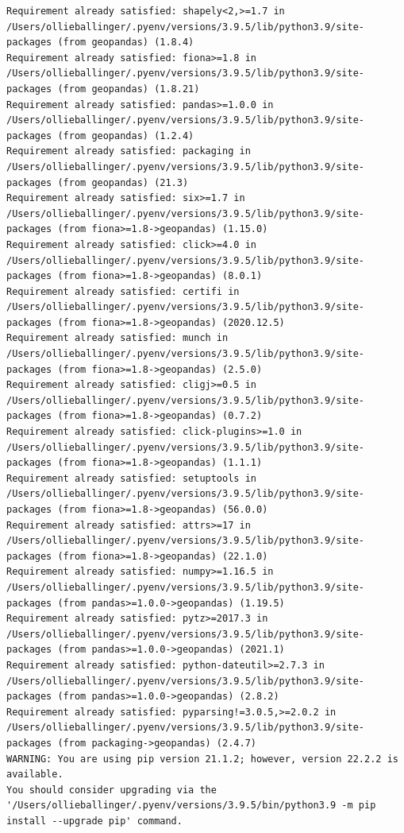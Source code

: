 \documentclass[
  letterpaper,
  DIV=11,
  numbers=noendperiod]{scrreprt}
\begin{document}
\begin{verbatim}
Requirement already satisfied: shapely<2,>=1.7 in /Users/ollieballinger/.pyenv/versions/3.9.5/lib/python3.9/site-packages (from geopandas) (1.8.4)
Requirement already satisfied: fiona>=1.8 in /Users/ollieballinger/.pyenv/versions/3.9.5/lib/python3.9/site-packages (from geopandas) (1.8.21)
Requirement already satisfied: pandas>=1.0.0 in /Users/ollieballinger/.pyenv/versions/3.9.5/lib/python3.9/site-packages (from geopandas) (1.2.4)
Requirement already satisfied: packaging in /Users/ollieballinger/.pyenv/versions/3.9.5/lib/python3.9/site-packages (from geopandas) (21.3)
Requirement already satisfied: six>=1.7 in /Users/ollieballinger/.pyenv/versions/3.9.5/lib/python3.9/site-packages (from fiona>=1.8->geopandas) (1.15.0)
Requirement already satisfied: click>=4.0 in /Users/ollieballinger/.pyenv/versions/3.9.5/lib/python3.9/site-packages (from fiona>=1.8->geopandas) (8.0.1)
Requirement already satisfied: certifi in /Users/ollieballinger/.pyenv/versions/3.9.5/lib/python3.9/site-packages (from fiona>=1.8->geopandas) (2020.12.5)
Requirement already satisfied: munch in /Users/ollieballinger/.pyenv/versions/3.9.5/lib/python3.9/site-packages (from fiona>=1.8->geopandas) (2.5.0)
Requirement already satisfied: cligj>=0.5 in /Users/ollieballinger/.pyenv/versions/3.9.5/lib/python3.9/site-packages (from fiona>=1.8->geopandas) (0.7.2)
Requirement already satisfied: click-plugins>=1.0 in /Users/ollieballinger/.pyenv/versions/3.9.5/lib/python3.9/site-packages (from fiona>=1.8->geopandas) (1.1.1)
Requirement already satisfied: setuptools in /Users/ollieballinger/.pyenv/versions/3.9.5/lib/python3.9/site-packages (from fiona>=1.8->geopandas) (56.0.0)
Requirement already satisfied: attrs>=17 in /Users/ollieballinger/.pyenv/versions/3.9.5/lib/python3.9/site-packages (from fiona>=1.8->geopandas) (22.1.0)
Requirement already satisfied: numpy>=1.16.5 in /Users/ollieballinger/.pyenv/versions/3.9.5/lib/python3.9/site-packages (from pandas>=1.0.0->geopandas) (1.19.5)
Requirement already satisfied: pytz>=2017.3 in /Users/ollieballinger/.pyenv/versions/3.9.5/lib/python3.9/site-packages (from pandas>=1.0.0->geopandas) (2021.1)
Requirement already satisfied: python-dateutil>=2.7.3 in /Users/ollieballinger/.pyenv/versions/3.9.5/lib/python3.9/site-packages (from pandas>=1.0.0->geopandas) (2.8.2)
Requirement already satisfied: pyparsing!=3.0.5,>=2.0.2 in /Users/ollieballinger/.pyenv/versions/3.9.5/lib/python3.9/site-packages (from packaging->geopandas) (2.4.7)
WARNING: You are using pip version 21.1.2; however, version 22.2.2 is available.
You should consider upgrading via the '/Users/ollieballinger/.pyenv/versions/3.9.5/bin/python3.9 -m pip install --upgrade pip' command.
\end{verbatim}
\end{document}
